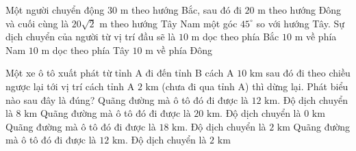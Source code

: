 \begin{vd} Một người chuyển động $30\text{ m}$ theo hướng Bắc, sau đó đi $20\text{ m}$ theo hướng Đông và cuối cùng là $20\sqrt{2}\text{ m}$ theo hướng Tây Nam một góc $45^\circ$ so với hướng Tây. Sự dịch chuyển của người từ vị trí đầu sẽ là
\choice
{\True $10\text{ m}$ dọc theo phía Bắc}
{$10\text{ m}$ về phía Nam}
{$10\text{ m}$ dọc theo phía Tây}
{$10\text{ m}$ về phía Đông}
\end{vd}

\begin{vd} Một xe ô tô xuất phát từ tỉnh A đi đến tỉnh B cách A $10\text{ km}$ sau đó đi theo chiều ngược lại tới vị trí cách tỉnh A $2\text{ km}$ (chưa đi qua tỉnh A) thì dừng lại. Phát biểu nào sau đây là đúng?
\choice
{Quãng đường mà ô tô đó đi được là $12\text{ km}$. Độ dịch chuyển là $8\text{ km}$}
{Quãng đường mà ô tô đó đi được là $20\text{ km}$. Độ dịch chuyển là $0\text{ km}$}
{\True Quãng đường mà ô tô đó đi được là $18\text{ km}$. Độ dịch chuyển là $2\text{ km}$}
{Quãng đường mà ô tô đó đi được là $12\text{ km}$. Độ dịch chuyển là $2\text{ km}$}
\end{vd}

